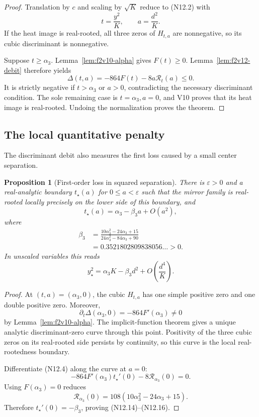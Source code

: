 \documentclass[11pt]{article}
\newtheorem{proposition}[theorem]{Proposition}
\theoremstyle{definition}
\theoremstyle{remark}
\begin{document}
\begin{proof}
Translation by \(c\) and scaling by \(\sqrt K\) reduce to
\textup{(N12.2)} with
\[
 t=\frac{y^2}{K},\qquad a=\frac{d^2}{K}.
 \tag{N12.12}
\]
If the heat image is real-rooted, all three zeros of \(H_{t,a}\) are
nonnegative, so its cubic discriminant is nonnegative.

Suppose \(t\ge\alpha_3\).  Lemma~\ref{lem:f2v10-alpha} gives
\(F(t)\ge0\).  Lemma~\ref{lem:f2v12-debit} therefore yields
\[
 \Delta(t,a)
 =-864F(t)-8a\mathcal R_t(a)\le0.
 \tag{N12.13}
\]
It is strictly negative if \(t>\alpha_3\) or \(a>0\), contradicting the
necessary discriminant condition.  The sole remaining case is
\(t=\alpha_3,a=0\), and V10 proves that its heat image is real-rooted.
Undoing the normalization proves the theorem.
\end{proof}

\subsection{The local quantitative penalty}

The discriminant debit also measures the first loss caused by a small
center separation.

\begin{proposition}[First-order loss in squared separation]
\label{prop:f2v12-local}
There is \(\varepsilon>0\) and a real-analytic boundary
\(t_\star(a)\) for \(0\le a<\varepsilon\) such that the mirror family is
real-rooted locally precisely on the lower side of this boundary, and
\[
 \boxed{
 t_\star(a)=\alpha_3-\beta_3a+O(a^2),}
 \tag{N12.14}
\]
where
\[
\begin{aligned}
 \beta_3
 &=\frac{10\alpha_3^2-24\alpha_3+15}
 {24\alpha_3^2-84\alpha_3+90}\\
 &=0.3521802809838056\ldots>0.
\end{aligned}
\tag{N12.15}
\]
In unscaled variables this reads
\[
 y_\star^2
 =\alpha_3K-\beta_3d^2
 +O\left(\frac{d^4}{K}\right).
 \tag{N12.16}
\]
\end{proposition}

\begin{proof}
At \((t,a)=(\alpha_3,0)\), the cubic \(H_{t,a}\) has one simple positive
zero and one double positive zero.  Moreover,
\[
 \partial_t\Delta(\alpha_3,0)
 =-864F'(\alpha_3)\ne0
\]
by Lemma~\ref{lem:f2v10-alpha}.  The implicit-function theorem gives a
unique analytic discriminant-zero curve through this point.  Positivity
of the three cubic zeros on its real-rooted side persists by continuity,
so this curve is the local real-rootedness boundary.

Differentiate \textup{(N12.4)} along the curve at \(a=0\):
\[
 -864F'(\alpha_3)t_\star'(0)
 -8\mathcal R_{\alpha_3}(0)=0.
 \tag{N12.17}
\]
Using \(F(\alpha_3)=0\) reduces
\[
 \mathcal R_{\alpha_3}(0)
 =108(10\alpha_3^2-24\alpha_3+15).
 \tag{N12.18}
\]
Therefore \(t_\star'(0)=-\beta_3\), proving
\textup{(N12.14)}--\textup{(N12.16)}.
\end{proof}
\end{document}
